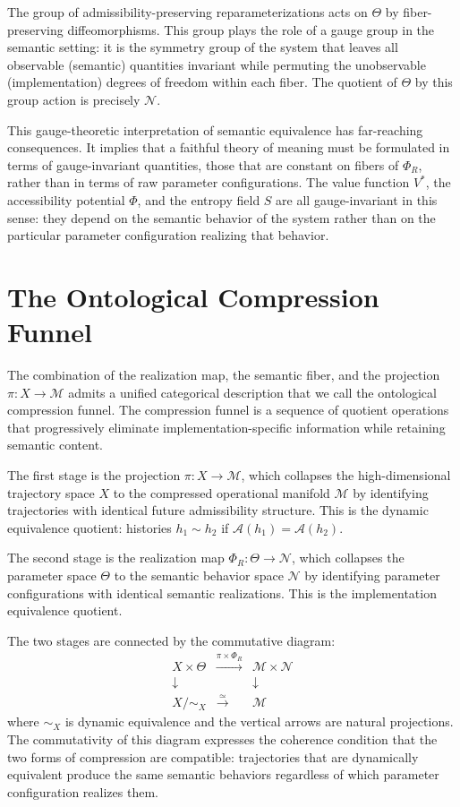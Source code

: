 \documentclass[12pt, a4paper, openany]{book}
\theoremstyle{plain}
\theoremstyle{definition}
\theoremstyle{remark}
\newcommand{\Sfield}{S}
\newcommand{\Adm}{\mathcal{A}}
\begin{document}
The group of admissibility-preserving reparameterizations acts on $\Theta$ by fiber-preserving diffeomorphisms. This group plays the role of a gauge group in the semantic setting: it is the symmetry group of the system that leaves all observable (semantic) quantities invariant while permuting the unobservable (implementation) degrees of freedom within each fiber. The quotient of $\Theta$ by this group action is precisely $\mathcal{N}$.

This gauge-theoretic interpretation of semantic equivalence has far-reaching consequences. It implies that a faithful theory of meaning must be formulated in terms of gauge-invariant quantities, those that are constant on fibers of $\Phi_R$, rather than in terms of raw parameter configurations. The value function $V^*$, the accessibility potential $\Phi$, and the entropy field $\Sfield$ are all gauge-invariant in this sense: they depend on the semantic behavior of the system rather than on the particular parameter configuration realizing that behavior.

\section{The Ontological Compression Funnel}

The combination of the realization map, the semantic fiber, and the projection $\pi: X \to \mathcal{M}$ admits a unified categorical description that we call the ontological compression funnel. The compression funnel is a sequence of quotient operations that progressively eliminate implementation-specific information while retaining semantic content.

The first stage is the projection $\pi: X \to \mathcal{M}$, which collapses the high-dimensional trajectory space $X$ to the compressed operational manifold $\mathcal{M}$ by identifying trajectories with identical future admissibility structure. This is the dynamic equivalence quotient: histories $h_1 \sim h_2$ if $\Adm(h_1) = \Adm(h_2)$.

The second stage is the realization map $\Phi_R: \Theta \to \mathcal{N}$, which collapses the parameter space $\Theta$ to the semantic behavior space $\mathcal{N}$ by identifying parameter configurations with identical semantic realizations. This is the implementation equivalence quotient.

The two stages are connected by the commutative diagram:
\[
\begin{array}{ccc}
X \times \Theta & \xrightarrow{\pi \times \Phi_R} & \mathcal{M} \times \mathcal{N} \\
\downarrow & & \downarrow \\
X/{\sim_X} & \xrightarrow{\simeq} & \mathcal{M}
\end{array}
\]
where $\sim_X$ is dynamic equivalence and the vertical arrows are natural projections. The commutativity of this diagram expresses the coherence condition that the two forms of compression are compatible: trajectories that are dynamically equivalent produce the same semantic behaviors regardless of which parameter configuration realizes them.
\end{document}
